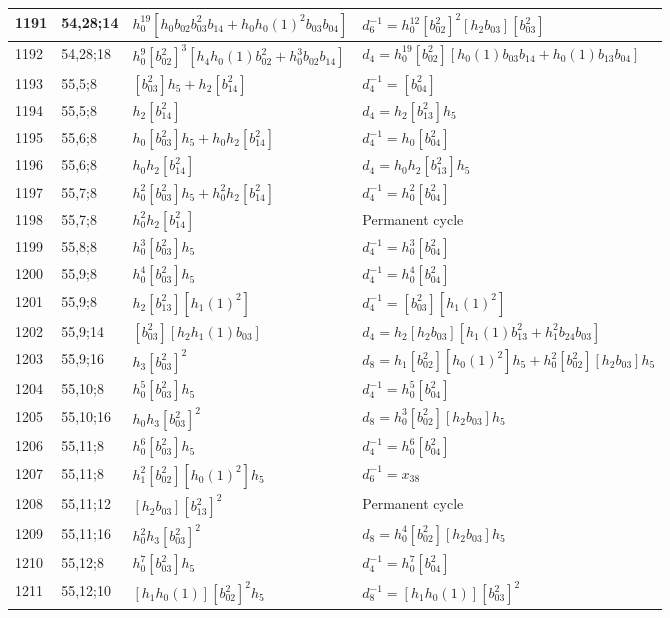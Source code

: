 \documentclass{article}
\begin{document}
\begin{longtable}{|l|l|>{\raggedright\arraybackslash}p{6cm}|>{\raggedright\arraybackslash}p{6cm}|}
\hline
1191 & 54,28;14 & $h_0^{19}[h_0b_{02}b_{03}^2b_{14} + h_0h_0(1)^2b_{03}b_{04}]$ & $d_{6}^{-1}=h_0^{12}[b_{02}^2]^2[h_2b_{03}][b_{03}^2]$\\
\hline
1192 & 54,28;18 & $h_0^9[b_{02}^2]^3[h_4h_0(1)b_{02}^2 + h_0^3b_{02}b_{14}]$ &$d_{4}=h_0^{19}[b_{02}^2][h_0(1)b_{03}b_{14} + h_0(1)b_{13}b_{04}]$\\
\hline
1193 & 55,5;8 & $[b_{03}^2]h_5 + h_2[b_{14}^2]$ & $d_{4}^{-1}=[b_{04}^2]$\\
1194 & 55,5;8 & $h_2[b_{14}^2]$ &$d_{4}=h_2[b_{13}^2]h_5$\\
\hline
1195 & 55,6;8 & $h_0[b_{03}^2]h_5 + h_0h_2[b_{14}^2]$ & $d_{4}^{-1}=h_0[b_{04}^2]$\\
1196 & 55,6;8 & $h_0h_2[b_{14}^2]$ &$d_{4}=h_0h_2[b_{13}^2]h_5$\\
\hline
1197 & 55,7;8 & $h_0^2[b_{03}^2]h_5 + h_0^2h_2[b_{14}^2]$ & $d_{4}^{-1}=h_0^2[b_{04}^2]$\\
1198 & 55,7;8 & $h_0^2h_2[b_{14}^2]$ & Permanent cycle\\
\hline
1199 & 55,8;8 & $h_0^3[b_{03}^2]h_5$ & $d_{4}^{-1}=h_0^3[b_{04}^2]$\\
\hline
1200 & 55,9;8 & $h_0^4[b_{03}^2]h_5$ & $d_{4}^{-1}=h_0^4[b_{04}^2]$\\
1201 & 55,9;8 & $h_2[b_{13}^2][h_1(1)^2]$ & $d_{4}^{-1}=[b_{03}^2][h_1(1)^2]$\\
\hline
1202 & 55,9;14 & $[b_{03}^2][h_2h_1(1)b_{03}]$ &$d_{4}=h_2[h_2b_{03}][h_1(1)b_{13}^2 + h_1^2b_{24}b_{03}]$\\
\hline
1203 & 55,9;16 & $h_3[b_{03}^2]^2$ &$d_{8}=h_1[b_{02}^2][h_0(1)^2]h_5 + h_0^2[b_{02}^2][h_2b_{03}]h_5$\\
\hline
1204 & 55,10;8 & $h_0^5[b_{03}^2]h_5$ & $d_{4}^{-1}=h_0^5[b_{04}^2]$\\
\hline
1205 & 55,10;16 & $h_0h_3[b_{03}^2]^2$ &$d_{8}=h_0^3[b_{02}^2][h_2b_{03}]h_5$\\
\hline
1206 & 55,11;8 & $h_0^6[b_{03}^2]h_5$ & $d_{4}^{-1}=h_0^6[b_{04}^2]$\\
1207 & 55,11;8 & $h_1^2[b_{02}^2][h_0(1)^2]h_5$ & $d_{6}^{-1}=x_{38}$\\
\hline
1208 & 55,11;12 & $[h_2b_{03}][b_{13}^2]^2$ & Permanent cycle\\
\hline
1209 & 55,11;16 & $h_0^2h_3[b_{03}^2]^2$ &$d_{8}=h_0^4[b_{02}^2][h_2b_{03}]h_5$\\
\hline
1210 & 55,12;8 & $h_0^7[b_{03}^2]h_5$ & $d_{4}^{-1}=h_0^7[b_{04}^2]$\\
\hline
1211 & 55,12;10 & $[h_1h_0(1)][b_{02}^2]^2h_5$ & $d_{8}^{-1}=[h_1h_0(1)][b_{03}^2]^2$\\

\end{longtable}
\end{document}
